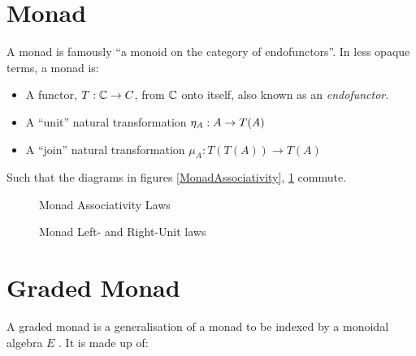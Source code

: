 \documentclass{Report}
\begin{document}
\section{Monad}
A monad is famously ``a monoid on the category of endofunctors''. In less opaque terms, a monad is:

\begin{itemize}
    \item A functor, $T: \mathbb{C} \rightarrow C$, from $\mathbb{C}$ onto itself, also known as an \textit{endofunctor}.
    \item A ``unit'' natural transformation $\eta_{A}: A\rightarrow T(A)$
    \item A ``join'' natural transformation $\mu_{A}: T(T(A)) \rightarrow T(A)$
\end{itemize}

Such that the diagrams in figures \ref{MonadAssociativity}, \ref{MonadUnits} commute.


\begin{figure}
    \centering
    \begin{minipage}{0.45\textwidth}
        \centering
        \caption{Monad Associativity Laws}
        \label{MonadAssociativity}
    \end{minipage}\hfill
    \begin{minipage}{0.45\textwidth}
        \centering
        \caption{Monad Left- and Right-Unit laws}
        \label{MonadUnits}
    \end{minipage}
\end{figure}




\section{Graded Monad}

A graded monad is a generalisation of a monad to be indexed by a monoidal algebra $E$ . It is made up of:
\end{document}

